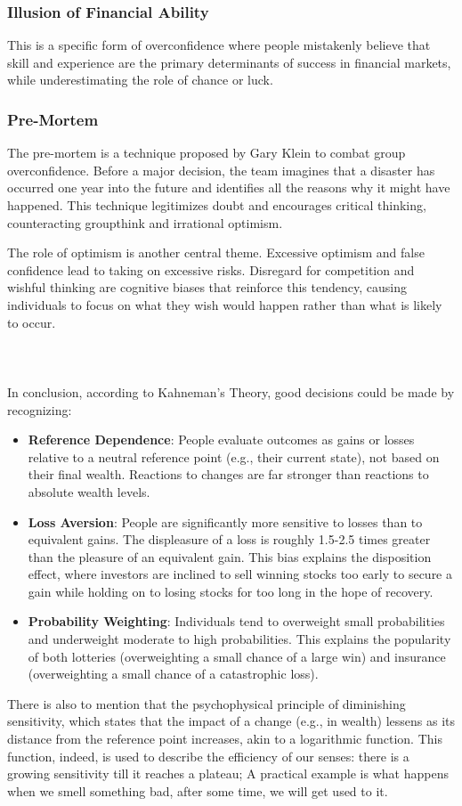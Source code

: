 \documentclass{article}
\begin{document}
\subsubsection*{Illusion of Financial Ability}
This is a specific form of overconfidence where people mistakenly believe that skill and experience are the primary determinants of success in financial markets, while underestimating the role of chance or luck.

\subsubsection*{Pre-Mortem}
The pre-mortem is a technique proposed by Gary Klein to combat group overconfidence. Before a major decision, the team imagines that a disaster has occurred one year into the future and identifies all the reasons why it might have happened. This technique legitimizes doubt and encourages critical thinking, counteracting groupthink and irrational optimism.

The role of optimism is another central theme. Excessive optimism and false confidence lead to taking on excessive risks. Disregard for competition and wishful thinking are cognitive biases that reinforce this tendency, causing individuals to focus on what they wish would happen rather than what is likely to occur.\\\\\\\\
In conclusion, according to Kahneman's Theory, good decisions could be made by recognizing:
\begin{itemize}
\item \textbf{Reference Dependence}: People evaluate outcomes as gains or losses relative to a neutral reference point (e.g., their current state), not based on their final wealth. Reactions to changes are far stronger than reactions to absolute wealth levels.
\item \textbf{Loss Aversion}: People are significantly more sensitive to losses than to equivalent gains. The displeasure of a loss is roughly 1.5-2.5 times greater than the pleasure of an equivalent gain. This bias explains the disposition effect, where investors are inclined to sell winning stocks too early to secure a gain while holding on to losing stocks for too long in the hope of recovery.
\item \textbf{Probability Weighting}: Individuals tend to overweight small probabilities and underweight moderate to high probabilities. This explains the popularity of both lotteries (overweighting a small chance of a large win) and insurance (overweighting a small chance of a catastrophic loss).
\end{itemize}
There is also to mention that the psychophysical principle of diminishing sensitivity, which states that the impact of a change (e.g., in wealth) lessens as its distance from the reference point increases, akin to a logarithmic function. This function, indeed, is used to describe the efficiency of our senses: there is a growing sensitivity till it reaches a plateau; A practical example is what happens when we smell something bad, after some time, we will get used to it.
\end{document}
